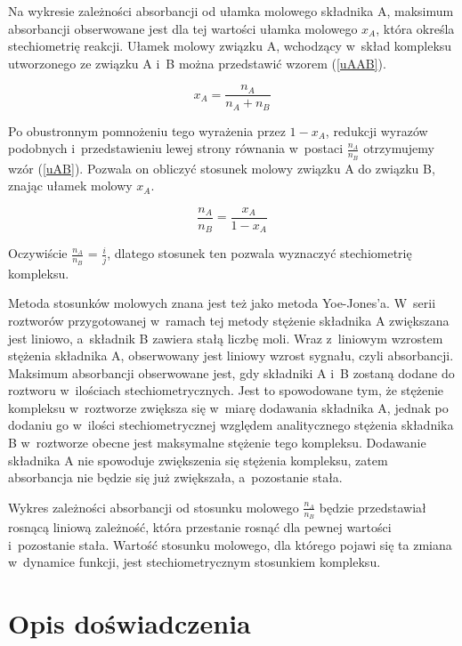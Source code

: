 \documentclass[12pt]{article}
\begin{document}
Na wykresie zależności absorbancji od ułamka molowego składnika A, maksimum absorbancji obserwowane jest dla tej wartości ułamka molowego $x_A$, która określa stechiometrię reakcji. Ułamek molowy związku A, wchodzący w~skład kompleksu utworzonego ze związku A i~B można przedstawić wzorem (\ref{uAAB}).

\begin{equation}
    x_A = \frac{n_A}{n_A + n_B}
    \label{uAAB}
\end{equation}

\noindent Po obustronnym pomnożeniu tego wyrażenia przez $1 - x_A$, redukcji wyrazów podobnych i~przedstawieniu lewej strony równania w~postaci $\frac{n_A}{n_B}$ otrzymujemy wzór (\ref{uAB}). Pozwala on obliczyć stosunek molowy związku A do związku B, znając ułamek molowy $x_A$.

\begin{equation}
    \frac{n_A}{n_B} = \frac{x_A}{1 - x_A}
    \label{uAB}
\end{equation}

\noindent Oczywiście $\frac{n_A}{n_B}$ = $\frac{i}{j}$, dlatego stosunek ten pozwala wyznaczyć stechiometrię kompleksu.

Metoda stosunków molowych znana jest też jako metoda Yoe-Jones'a. W~serii roztworów przygotowanej w~ramach tej metody stężenie składnika A zwiększana jest liniowo, a~składnik B zawiera stałą liczbę moli. Wraz z~liniowym wzrostem stężenia składnika A, obserwowany jest liniowy wzrost sygnału, czyli absorbancji.  Maksimum absorbancji obserwowane jest, gdy składniki A i~B zostaną dodane do roztworu w~ilościach stechiometrycznych. Jest to spowodowane tym, że stężenie kompleksu w~roztworze zwiększa się w~miarę dodawania składnika A, jednak po dodaniu go w~ilości stechiometrycznej względem analitycznego stężenia składnika B w~roztworze obecne jest maksymalne stężenie tego kompleksu. Dodawanie składnika A nie spowoduje zwiększenia się stężenia kompleksu, zatem absorbancja nie będzie się już zwiększała, a~pozostanie stała.

Wykres zależności absorbancji od stosunku molowego $\frac{n_A}{n_B}$ będzie przedstawiał rosnącą liniową zależność, która przestanie rosnąć dla pewnej wartości i~pozostanie stała. Wartość stosunku molowego, dla którego pojawi się ta zmiana w~dynamice funkcji, jest stechiometrycznym stosunkiem kompleksu.



\section{Opis doświadczenia}
\end{document}
